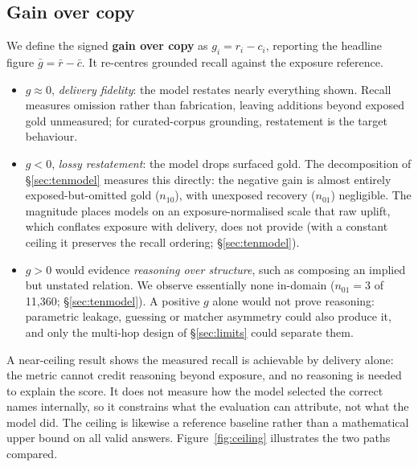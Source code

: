 \subsection{Gain over copy}
We define the signed \textbf{gain over copy} as $g_i=r_i-c_i$, reporting the headline figure $\bar g=\bar r-\bar c$. It re-centres grounded recall against the exposure reference.
\begin{itemize}[topsep=2pt,itemsep=1pt,leftmargin=1.4em]
\item $g\approx0$, \emph{delivery fidelity}: the model restates nearly everything shown. Recall measures omission rather than fabrication, leaving additions beyond exposed gold unmeasured; for curated-corpus grounding, restatement is the target behaviour.
\item $g<0$, \emph{lossy restatement}: the model drops surfaced gold. The decomposition of \S\ref{sec:tenmodel} measures this directly: the negative gain is almost entirely exposed-but-omitted gold ($n_{10}$), with unexposed recovery ($n_{01}$) negligible. The magnitude places models on an exposure-normalised scale that raw uplift, which conflates exposure with delivery, does not provide (with a constant ceiling it preserves the recall ordering; \S\ref{sec:tenmodel}).
\item $g>0$ would evidence \emph{reasoning over structure}, such as composing an implied but unstated relation. We observe essentially none in-domain ($n_{01}=3$ of 11{,}360; \S\ref{sec:tenmodel}). A positive $g$ alone would not prove reasoning: parametric leakage, guessing or matcher asymmetry could also produce it, and only the multi-hop design of \S\ref{sec:limits} could separate them.
\end{itemize}
A near-ceiling result shows the measured recall is achievable by delivery alone: the metric cannot credit reasoning beyond exposure, and no reasoning is needed to explain the score. It does not measure how the model selected the correct names internally, so it constrains what the evaluation can attribute, not what the model did. The ceiling is likewise a reference baseline rather than a mathematical upper bound on all valid answers. Figure~\ref{fig:ceiling} illustrates the two paths compared.



